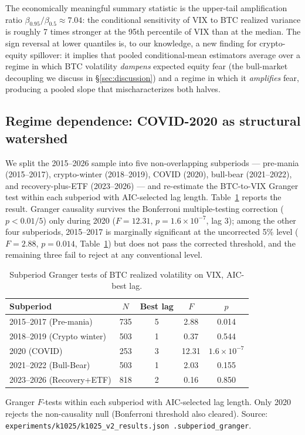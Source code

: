 \documentclass[11pt,a4paper]{article}
\begin{document}
The economically meaningful summary statistic is the upper-tail amplification ratio $\beta_{0.95} / \beta_{0.5} \approx 7.04$: the conditional sensitivity of VIX to BTC realized variance is roughly 7 times stronger at the 95th percentile of VIX than at the median. The sign reversal at lower quantiles is, to our knowledge, a new finding for crypto-equity spillover: it implies that pooled conditional-mean estimators average over a regime in which BTC volatility \emph{dampens} expected equity fear (the bull-market decoupling we discuss in \S\ref{sec:discussion}) and a regime in which it \emph{amplifies} fear, producing a pooled slope that mischaracterizes both halves.

\subsection{Regime dependence: COVID-2020 as structural watershed}
\label{subsec:r_regime}

We split the 2015--2026 sample into five non-overlapping subperiods --- pre-mania (2015--2017), crypto-winter (2018--2019), COVID (2020), bull-bear (2021--2022), and recovery-plus-ETF (2023--2026) --- and re-estimate the BTC-to-VIX Granger test within each subperiod with AIC-selected lag length. Table~\ref{tab:subperiod} reports the result. Granger causality survives the Bonferroni multiple-testing correction ($p < 0.01/5$) only during 2020 ($F = 12.31$, $p = 1.6 \times 10^{-7}$, lag 3); among the other four subperiods, 2015--2017 is marginally significant at the uncorrected 5\% level ($F = 2.88$, $p = 0.014$, Table~\ref{tab:subperiod}) but does not pass the corrected threshold, and the remaining three fail to reject at any conventional level.%

\begin{table}[H]
\centering
\caption{Subperiod Granger tests of BTC realized volatility on VIX, AIC-best lag.}
\label{tab:subperiod}
\begin{tabular}{lcccc}
\toprule
Subperiod & $N$ & Best lag & $F$ & $p$ \\
\midrule
2015--2017 (Pre-mania)         & 735 & 5 & 2.88  & 0.014 \\
2018--2019 (Crypto winter)     & 503 & 1 & 0.37  & 0.544 \\
2020 (COVID)                   & 253 & 3 & 12.31 & $1.6 \times 10^{-7}$ \\
2021--2022 (Bull-Bear)         & 503 & 1 & 2.03  & 0.155 \\
2023--2026 (Recovery+ETF)      & 818 & 2 & 0.16  & 0.850 \\
\bottomrule
\end{tabular}
\begin{flushleft}
\footnotesize Granger $F$-tests within each subperiod with AIC-selected lag length. Only 2020 rejects the non-causality null (Bonferroni threshold also cleared). Source: \texttt{experiments/k1025/k1025\_v2\_results.json .subperiod\_granger}.
\end{flushleft}
\end{table}
\end{document}
